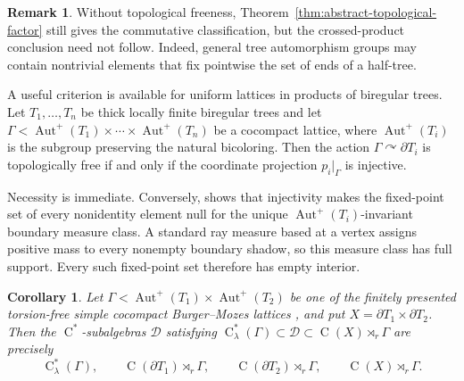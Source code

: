 \documentclass[11pt]{amsart}
\numberwithin{equation}{section}
\newcommand{\Aut}{\operatorname{Aut}}
\newcommand{\rC}{\operatorname{C}}
\newtheorem{corollary}[theorem]{Corollary}
\theoremstyle{definition}
\newtheorem{remark}[theorem]{Remark}
\begin{document}
	\begin{remark}
		\label{rem:tree-topological-freeness}
		Without topological freeness, Theorem~\ref{thm:abstract-topological-factor}
		still gives the commutative classification, but the crossed-product conclusion
		need not follow. Indeed, general tree automorphism groups may contain nontrivial
		elements that fix pointwise the set of ends of a half-tree.
	\end{remark}

	A useful criterion is available for uniform lattices in products of biregular
	trees. Let \(T_1,\ldots,T_n\) be
	thick locally finite biregular trees and let
	\(\Gamma<\Aut^+(T_1)\times\cdots\times\Aut^+(T_n)\) be a cocompact lattice,
	where \(\Aut^+(T_i)\) is the subgroup preserving the natural bicoloring. Then
	the action \(\Gamma\curvearrowright\partial T_i\) is topologically free if and
	only if the coordinate projection \(p_i|_\Gamma\) is injective.

	Necessity is immediate. Conversely, \cite[Proposition~6.4]{BBHP22} shows that
	injectivity makes the fixed-point set of every nonidentity element null for the
	unique $\Aut^+(T_i)$-invariant boundary measure class. A standard ray measure
	based at a vertex assigns positive mass to every nonempty boundary shadow, so
	this measure class has full support. Every such fixed-point set therefore has
	empty interior.

	\begin{corollary}
		Let \(\Gamma<\Aut^+(T_1)\times\Aut^+(T_2)\) be one of the finitely
		presented torsion-free simple cocompact Burger--Mozes lattices
		\cite{BM00b}, and put
		\(X=\partial T_1\times\partial T_2\). Then the \(\rC^*\)-subalgebras
		\(\mathcal D\) satisfying
		\(\rC^*_{\lambda}(\Gamma)\subset\mathcal D\subset\rC(X)\rtimes_r\Gamma\)
		are precisely
		\[
		\rC^*_{\lambda}(\Gamma),\qquad
		\rC(\partial T_1)\rtimes_r\Gamma,\qquad
		\rC(\partial T_2)\rtimes_r\Gamma,\qquad
		\rC(X)\rtimes_r\Gamma.
		\]
	\end{corollary}
\end{document}
